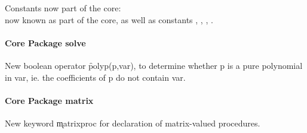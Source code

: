 Constants now part of the core:\\
 now known as part of the
core, as well as constants , , ,
.

\paragraph*{Core Package solve}

New boolean operator \f{polyp}(p,var), to determine whether p is a pure polynomial
in var, ie. the coefficients of p do not contain var.

\paragraph*{Core Package matrix}

New keyword \k{matrixproc} for declaration of matrix-valued procedures.

